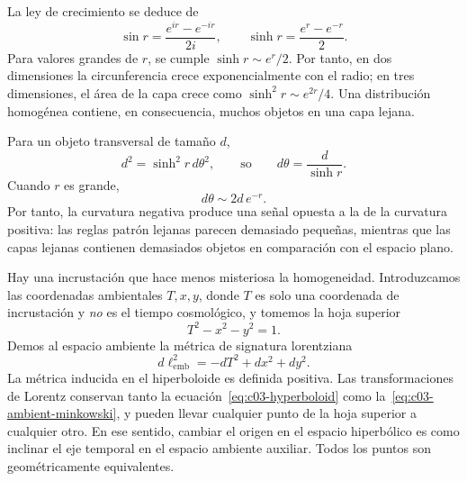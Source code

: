 La ley de crecimiento se deduce de
\begin{equation}
\sin r = \frac{e^{ir}-e^{-ir}}{2i},
\qquad
\sinh r = \frac{e^r-e^{-r}}{2}.
\label{eq:c03-sin-sinh}
\end{equation}
Para valores grandes de \(r\), se cumple \(\sinh r\sim e^r/2\). Por tanto, en dos dimensiones la circunferencia crece exponencialmente con el radio; en tres dimensiones, el área de la capa crece como \(\sinh^2r\sim e^{2r}/4\). Una distribución homogénea contiene, en consecuencia, muchos objetos en una capa lejana.

Para un objeto transversal de tamaño \(d\),
\begin{equation}
d^2 = \sinh^2 r\, d\theta^2,
\qquad\text{so}\qquad
d\theta = \frac{d}{\sinh r}.
\label{eq:c03-hyperbolic-angle}
\end{equation}
Cuando \(r\) es grande,
\begin{equation}
d\theta \sim 2d\,e^{-r}.
\end{equation}
Por tanto, la curvatura negativa produce una señal opuesta a la de la curvatura positiva: las reglas patrón lejanas parecen demasiado pequeñas, mientras que las capas lejanas contienen demasiados objetos en comparación con el espacio plano.

\begin{classroomqa}\end{classroomqa}

Hay una incrustación que hace menos misteriosa la homogeneidad. Introduzcamos las coordenadas ambientales \(T,x,y\), donde \(T\) es solo una coordenada de incrustación y \emph{no} es el tiempo cosmológico, y tomemos la hoja superior
\begin{equation}
T^2 - x^2 - y^2 = 1.
\label{eq:c03-hyperboloid}
\end{equation}
Demos al espacio ambiente la métrica de signatura lorentziana
\begin{equation}
d\ell_{\mathrm{emb}}^2=-dT^2+dx^2+dy^2.
\label{eq:c03-ambient-minkowski}
\end{equation}
La métrica inducida en el hiperboloide es definida positiva. Las transformaciones de Lorentz conservan tanto la ecuación~\eqref{eq:c03-hyperboloid} como la~\eqref{eq:c03-ambient-minkowski}, y pueden llevar cualquier punto de la hoja superior a cualquier otro. En ese sentido, cambiar el origen en el espacio hiperbólico es como inclinar el eje temporal en el espacio ambiente auxiliar. Todos los puntos son geométricamente equivalentes.

